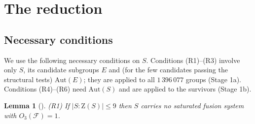 \documentclass[11pt]{article}
\newtheorem{lemma}[theorem]{Lemma}
\theoremstyle{definition}
\theoremstyle{remark}
\newcommand{\F}{\mathcal{F}}
\newcommand{\Aut}{\mathrm{Aut}}
\newcommand{\Z}{\mathrm{Z}}
\begin{document}
\section{The reduction}\label{sec:reduction}

\subsection{Necessary conditions}

We use the following necessary conditions on $S$.  Conditions
(R1)--(R3) involve only $S$, its candidate subgroups $E$ and (for the few
candidates passing the structural tests) $\Aut(E)$; they are applied to all
$1\,396\,077$ groups (Stage 1a).  Conditions (R4)--(R6) need $\Aut(S)$ and
are applied to the survivors (Stage 1b).

\begin{lemma}[{\cite[Lemma 7.1]{PS}}]\label{lem:R1}
{\rm (R1)} If $|S:\Z(S)|\le 9$ then $S$ carries no saturated fusion system
with $O_3(\F)=1$.
\end{lemma}
\end{document}
